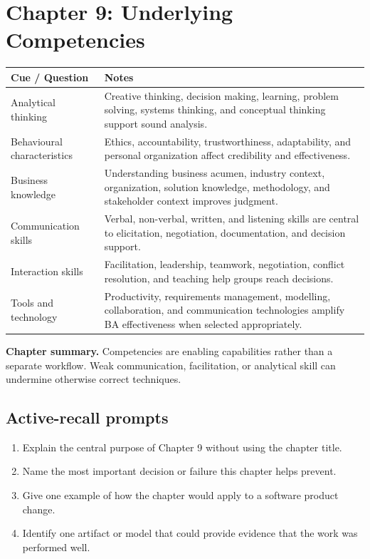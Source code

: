 \documentclass[11pt]{article}
\begin{document}
\section{Chapter 9: Underlying Competencies}
\begin{longtable}{L{0.26\textwidth} L{0.64\textwidth}}
\toprule
\textbf{Cue / Question} & \textbf{Notes}\\
\midrule
\endhead
Analytical thinking & Creative thinking, decision making, learning, problem solving, systems thinking, and conceptual thinking support sound analysis.\\
Behavioural characteristics & Ethics, accountability, trustworthiness, adaptability, and personal organization affect credibility and effectiveness.\\
Business knowledge & Understanding business acumen, industry context, organization, solution knowledge, methodology, and stakeholder context improves judgment.\\
Communication skills & Verbal, non-verbal, written, and listening skills are central to elicitation, negotiation, documentation, and decision support.\\
Interaction skills & Facilitation, leadership, teamwork, negotiation, conflict resolution, and teaching help groups reach decisions.\\
Tools and technology & Productivity, requirements management, modelling, collaboration, and communication technologies amplify BA effectiveness when selected appropriately.\\
\bottomrule
\end{longtable}
\begin{keybox}\textbf{Chapter summary.} Competencies are enabling capabilities rather than a separate workflow. Weak communication, facilitation, or analytical skill can undermine otherwise correct techniques.\end{keybox}
\subsection*{Active-recall prompts}
\begin{enumerate}
\item Explain the central purpose of Chapter 9 without using the chapter title.
\item Name the most important decision or failure this chapter helps prevent.
\item Give one example of how the chapter would apply to a software product change.
\item Identify one artifact or model that could provide evidence that the work was performed well.
\end{enumerate}
\end{document}

